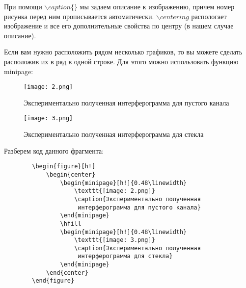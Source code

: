     При помощи $\backslash caption\{\}$ мы задаем описание к изображению, причем номер рисунка перед ним прописывается автоматически. $\backslash centering$ распологает изображение и все его дополнительные свойства по центру (в нашем случае описание).
    
    Если вам нужно расположить рядом несколько графиков, то вы можете сделать расположив их в ряд в одной строке. Для этого можно использовать функцию minipage:
    
    \begin{figure}[h!]
        \begin{center}
            \begin{minipage}[h!]{0.48\linewidth}
                \texttt{[image: 2.png]}
                \caption{Экспериментально полученная интерферограмма для пустого канала}
            \end{minipage}
            \hfill
            \begin{minipage}[h!]{0.48\linewidth}
                \texttt{[image: 3.png]}
                \caption{Экспериментально полученная интерферограмма для стекла}
            \end{minipage}
        \end{center}
    \end{figure}
    
    Разберем код данного фрагмента:
    
    \begin{verbatim}
        \begin{figure}[h!]
            \begin{center}
                \begin{minipage}[h!]{0.48\linewidth}
                    \texttt{[image: 2.png]}
                    \caption{Экспериментально полученная
                     интерферограмма для пустого канала}
                \end{minipage}
                \hfill
                \begin{minipage}[h!]{0.48\linewidth}
                    \texttt{[image: 3.png]}
                    \caption{Экспериментально полученная
                     интерферограмма для стекла}
                \end{minipage}
            \end{center}
        \end{figure}
    \end{verbatim}
    
